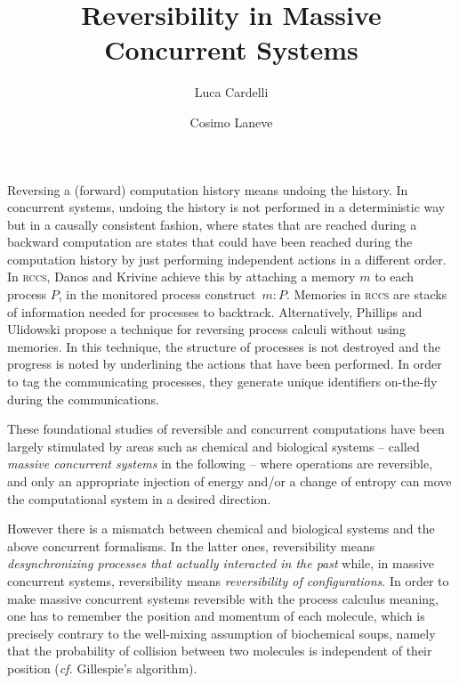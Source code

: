 \documentclass{mecbic}
\title{Reversibility in Massive Concurrent Systems}
\author{Luca Cardelli \institute{Microsoft
Research, Cambridge} \email{luca@microsoft.com} \and Cosimo Laneve \institute{Universit\`a di
Bologna}\email{laneve@cs.unibo.it}}
\newcommand{\rccs}{\textsc{rccs}}
\begin{document}
\maketitle
\pagestyle{plain}
\setcounter{page}{3}

\begin{abstract}

\end{abstract}

Reversing a (forward) computation history
means undoing the history.
In concurrent systems, undoing the history is not performed in a deterministic way but in a
causally consistent fashion, where states that are reached during a
backward computation are states that could have been reached during the
computation history by just performing independent actions in a different
order. In {\rccs}, Danos and Krivine achieve this
by attaching a memory $m$ to each process $P$, in
the monitored process construct~$m : P$. Memories in {\rccs} are
stacks of information needed for processes to backtrack.
Alternatively, Phillips and Ulidowski propose a technique for reversing process calculi
without using memories. In this technique,
the structure of processes is not destroyed and the progress is noted
by underlining the actions that have been performed. In order to tag the communicating processes, they generate unique identifiers on-the-fly during the communications.

These foundational studies of reversible and concurrent computations
have been largely stimulated by areas such as chemical
and biological systems -- called {\it massive concurrent systems} in the following -- where operations are reversible, and only an appropriate injection of
energy and/or a change of entropy can
move the computational system in a desired direction.


However there is a mismatch between chemical and biological
systems and
the above concurrent formalisms. In the latter ones, reversibility
means {\it desynchronizing processes that actually
interacted in the past} while, in massive concurrent systems,
reversibility means {\it reversibility of
 configurations}. In order
to make massive concurrent systems reversible with the process
calculus meaning,
one has to remember the position and
momentum of each molecule, which is precisely contrary to the well-mixing
assumption of biochemical soups, namely that the probability of collision
between two molecules is independent of their position ({\it cf.} Gillespie's algorithm).
\end{document}
